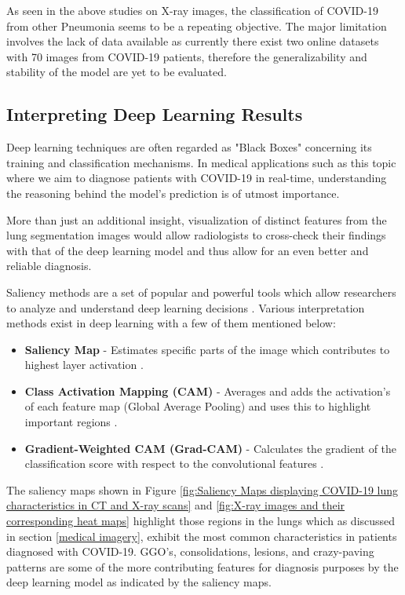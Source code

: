 As seen in the above studies on X-ray images, the classification of COVID-19 from other Pneumonia seems 
to be a repeating objective. The major limitation involves the lack of data available as 
currently there exist two online datasets with 70 images from COVID-19 patients, therefore 
the generalizability and stability of the model are yet to be evaluated.

\subsection{Interpreting Deep Learning Results}
\label{Interpreting Deep Learning Results}
Deep learning techniques are often regarded as "Black Boxes" concerning 
its training and classification mechanisms. In medical applications such as this topic where we 
aim to diagnose patients with COVID-19 in real-time, understanding the reasoning behind the model's prediction 
is of utmost importance. 

More than just an additional insight, visualization of distinct features 
from the lung segmentation images would allow radiologists to cross-check their findings with that of the deep 
learning model and thus allow for an even better and reliable diagnosis.

Saliency methods are a set of popular and powerful tools which allow researchers 
to analyze and understand deep learning decisions \cite{AGM+2018}. 
Various interpretation methods exist in deep learning with a few of them 
mentioned below:
\begin{itemize}
    \item \textbf{Saliency Map} - Estimates specific parts of the image which contributes to highest layer activation \cite{ZMF2013}.
    \item \textbf{Class Activation Mapping (CAM)} - Averages and adds the activation's of each feature map (Global Average Pooling) and uses this to highlight important regions \cite{ZKL+2015}.
    \item \textbf{Gradient-Weighted CAM (Grad-CAM)} - Calculates the gradient of the classification score with respect to the convolutional features \cite{RCD+2017}.
\end{itemize}

The saliency maps shown in Figure \ref{fig:Saliency Maps displaying COVID-19 lung characteristics in CT and X-ray scans} and \ref{fig:X-ray images and their corresponding heat maps} highlight those regions in the lungs 
which as discussed in section \ref{medical imagery}, exhibit the most common characteristics 
in patients diagnosed with COVID-19. 
GGO's, consolidations, lesions, and crazy-paving patterns are some of the 
more contributing features for diagnosis purposes by the 
deep learning model as indicated by the saliency maps.

